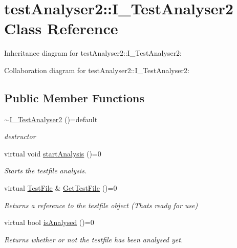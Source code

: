 \hypertarget{classtestAnalyser2_1_1I__TestAnalyser2}{}\section{test\+Analyser2\+::I\+\_\+\+Test\+Analyser2 Class Reference}
\label{classtestAnalyser2_1_1I__TestAnalyser2}


Inheritance diagram for test\+Analyser2\+::I\+\_\+\+Test\+Analyser2\+:


Collaboration diagram for test\+Analyser2\+::I\+\_\+\+Test\+Analyser2\+:
\subsection*{Public Member Functions}
\begin{DoxyCompactItemize}
\item 
\mbox{\label{classtestAnalyser2_1_1I__TestAnalyser2_acc01e7340b41a947b61fa6f233b4c302}} 
\mbox{\hyperlink{classtestAnalyser2_1_1I__TestAnalyser2_acc01e7340b41a947b61fa6f233b4c302}{$\sim$\+I\+\_\+\+Test\+Analyser2}} ()=default
\begin{DoxyCompactList}\small\item\em destructor \end{DoxyCompactList}\item 
\mbox{\label{classtestAnalyser2_1_1I__TestAnalyser2_a4b1be784ec14857fa9a72a00c3d5d542}} 
virtual void \mbox{\hyperlink{classtestAnalyser2_1_1I__TestAnalyser2_a4b1be784ec14857fa9a72a00c3d5d542}{start\+Analysis}} ()=0
\begin{DoxyCompactList}\small\item\em Starts the testfile analysis. \end{DoxyCompactList}\item 
virtual \mbox{\hyperlink{classtestAnalyser2_1_1TestFile}{Test\+File}} \& \mbox{\hyperlink{classtestAnalyser2_1_1I__TestAnalyser2_a82d50511e174a98572f8706d8ef06cc6}{Get\+Test\+File}} ()=0
\begin{DoxyCompactList}\small\item\em Returns a reference to the testfile object (That\textquotesingle{}s ready for use) \end{DoxyCompactList}\item 
virtual bool \mbox{\hyperlink{classtestAnalyser2_1_1I__TestAnalyser2_ab0d67cf406b889585af9eaa4479540ee}{is\+Analysed}} ()=0
\begin{DoxyCompactList}\small\item\em Returns whether or not the testfile has been analysed yet. \end{DoxyCompactList}\end{DoxyCompactItemize}


